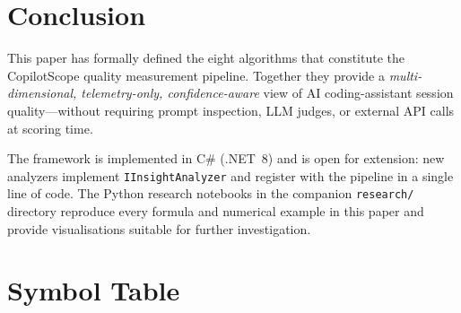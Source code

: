 \documentclass[11pt,a4paper]{article}
\begin{document}
\section{Conclusion}
\label{sec:conclusion}

This paper has formally defined the eight algorithms that constitute the
CopilotScope quality measurement pipeline.  Together they provide a
\emph{multi-dimensional, telemetry-only, confidence-aware} view of AI
coding-assistant session quality---without requiring prompt inspection,
LLM judges, or external API calls at scoring time.

The framework is implemented in C\# (.NET~8) and is open for extension:
new analyzers implement \texttt{IInsightAnalyzer} and register with the
pipeline in a single line of code.  The Python research notebooks in the
companion \texttt{research/} directory reproduce every formula and numerical
example in this paper and provide visualisations suitable for further
investigation.

\appendix

\section{Symbol Table}
\label{app:symbols}
\end{document}
